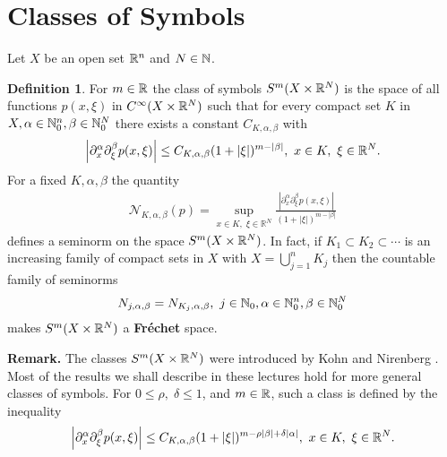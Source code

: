\documentclass[12pt,reqno]{amsart}
\newcommand{\rr}{\mathbb{R}}
\theoremstyle{plain}  %
\theoremstyle{definition}
\newtheorem{definition}{Definition}
\newcommand{\nin}{\noindent}
\begin{document}
\section{Classes of Symbols}
\medskip
\nin
Let $ X $ be an open set $ {\Bbb R^n} $ and $ N \in \Bbb N $.
\medskip
\nin
\begin{definition}  For $ m \in \Bbb R $ the class of symbols $
S^m (X \times \Bbb R^N) $ is the space of all functions $ p(x, \xi)
$ in $ C^\infty (X \times \Bbb R^N) $ such that for every compact
set $ K $ in $ X, \alpha \in \Bbb N^n_0, \beta \in \Bbb N^N_0 $ there
exists a constant $ C_{K, \alpha, \beta} $ with
\begin{equation}
	\begin{split}
		\left | \partial^\alpha_x \partial^\beta_\xi p(x, \xi) \right | \le C_{K,
\alpha, \beta} (1 + |\xi|)^{m - |\beta |}, \ x \in K, \ \xi \in \Bbb R^N. 
		\label{1'}
	\end{split}
\end{equation}
For a fixed $ K, \alpha, \beta $ the quantity
\begin{equation*}
	\begin{split}
		\mathcal{N}_{K, \alpha, \beta} (p) = 
		\sup_{x \in K , \; \xi \in \rr^N}   \frac{\left |
\partial^\alpha_x \partial^\beta_\xi p(x, \xi) \right |}{(1 + |\xi|)^{m -
|\beta |}}
	\end{split}
\end{equation*}
defines a seminorm on the space $ S^m (X \times \Bbb R^N)$.  In fact, if
$ K_1 \subset K_2 \subset \cdots$ is an increasing family of compact
sets  in $ X $ with $ X = \bigcup^n_{j=1} K_j $  then the
countable family of seminorms 
$$N_{j, \alpha, \beta} = N_{K_j, \alpha, \beta}, \ j \in \Bbb N_0, \alpha
\in \Bbb N^n_0, \beta \in \Bbb N^N_0$$
\nin
makes $ S^m (X \times \Bbb R^N) $ a {\bf Fr\'echet} space.
\end{definition}
\vskip0.1in
\nin
{\bf Remark.} The classes  $S^m (X \times \Bbb R^N) $ were introduced by
Kohn and Nirenberg \cite{}.
 Most of the results we shall describe in these
lectures hold for more general classes of symbols.  For $ 0 \le \rho, \; \delta
\le 1$, and $ m \in \Bbb R$, such a class is defined by the inequality
\begin{equation}
	\begin{split}
		\left | \partial^\alpha_x \partial^\beta_\xi p(x, \xi) \right | \le C_{K,
\alpha, \beta} (1 + |\xi|)^{m-\rho |\beta| + \delta |\alpha|}, \ x \in K, \ \xi
\in \Bbb R^N. 
		\label{1''}
	\end{split}
\end{equation}
\end{document}
